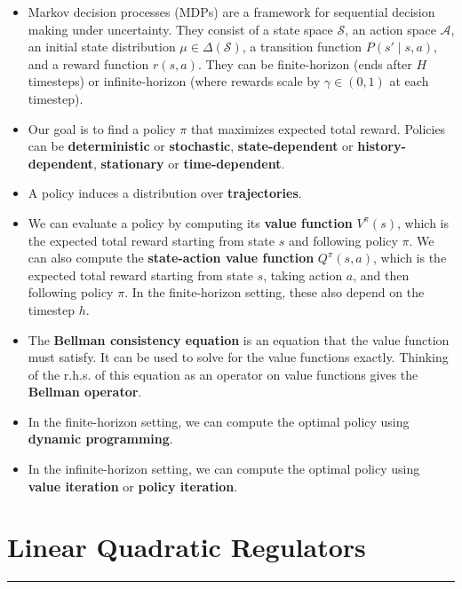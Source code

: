 \documentclass[
  letterpaper,
  DIV=11,
  numbers=noendperiod]{scrreprt}
\theoremstyle{plain}
\theoremstyle{plain}
\theoremstyle{definition}
\theoremstyle{definition}
\theoremstyle{remark}
\begin{document}
\begin{itemize}
\item
  Markov decision processes (MDPs) are a framework for sequential
  decision making under uncertainty. They consist of a state space
  \(\mathcal{S}\), an action space \(\mathcal{A}\), an initial state
  distribution \(\mu \in \Delta(\mathcal{S})\), a transition function
  \(P(s' \mid s, a)\), and a reward function \(r(s, a)\). They can be
  finite-horizon (ends after \(H\) timesteps) or infinite-horizon (where
  rewards scale by \(\gamma \in (0, 1)\) at each timestep).
\item
  Our goal is to find a policy \(\pi\) that maximizes expected total
  reward. Policies can be \textbf{deterministic} or \textbf{stochastic},
  \textbf{state-dependent} or \textbf{history-dependent},
  \textbf{stationary} or \textbf{time-dependent}.
\item
  A policy induces a distribution over \textbf{trajectories}.
\item
  We can evaluate a policy by computing its \textbf{value function}
  \(V^\pi(s)\), which is the expected total reward starting from state
  \(s\) and following policy \(\pi\). We can also compute the
  \textbf{state-action value function} \(Q^\pi(s, a)\), which is the
  expected total reward starting from state \(s\), taking action \(a\),
  and then following policy \(\pi\). In the finite-horizon setting,
  these also depend on the timestep \(h\).
\item
  The \textbf{Bellman consistency equation} is an equation that the
  value function must satisfy. It can be used to solve for the value
  functions exactly. Thinking of the r.h.s. of this equation as an
  operator on value functions gives the \textbf{Bellman operator}.
\item
  In the finite-horizon setting, we can compute the optimal policy using
  \textbf{dynamic programming}.
\item
  In the infinite-horizon setting, we can compute the optimal policy
  using \textbf{value iteration} or \textbf{policy iteration}.
\end{itemize}


\chapter{Linear Quadratic Regulators}\label{sec-control}

\begin{center}\rule{0.5\linewidth}{0.5pt}\end{center}
\end{document}
